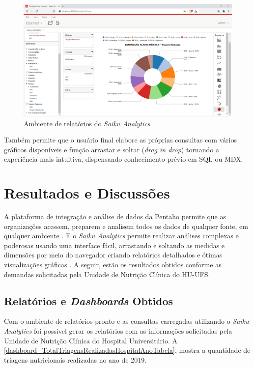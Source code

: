 \begin{figure}[htb]
	\caption{\label{fig_saikuanalytics}Ambiente de relatórios do \textit{Saiku Analytics}.}
	\begin{center}
	    \includegraphics[scale=0.45]{Imagens/figura - saikudashboard.png}
	\end{center}
\end{figure}

Também permite que o usuário final elabore as próprias consultas com vários gráficos disponíveis e função arrastar e soltar (\textit{drag in drop}) tornando a experiência mais intuitiva, dispensando conhecimento prévio em SQL ou MDX. 

\section{Resultados e Discussões}

A plataforma de integração e análise de dados da Pentaho permite que as organizações acessem, preparem e analisem todos os dados de qualquer fonte, em qualquer ambiente \cite{pentahosite}. E o \textit{Saiku Analytics} permite realizar análises complexas e poderosas usando uma interface fácil, arrastando e soltando as medidas e dimensões por meio do navegador criando relatórios detalhados e ótimas visualizações gráficas \cite{meteoribisite}. A seguir, estão  os resultados obtidos conforme as demandas solicitadas pela Unidade de Nutrição Clínica do HU-UFS.

\subsection{Relatórios e \textit{Dashboards} Obtidos}
Com o ambiente de relatórios pronto e as consultas carregadas utilizando o \textit{Saiku Analytics} foi possível gerar os relatórios com as informações solicitadas pela Unidade de Nutrição Clínica do Hospital Universitário. A \autoref{dashboard_TotalTriagensRealizadasHospitalAnoTabela}, mostra a quantidade de triagens nutricionais realizadas no ano de 2019.

